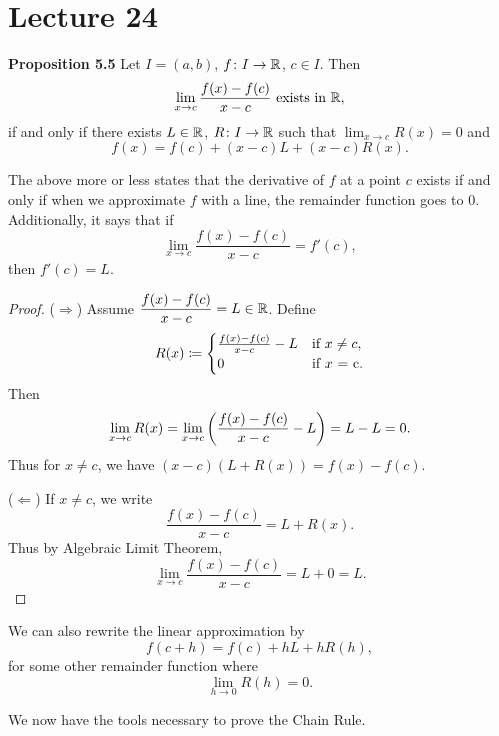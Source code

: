 \documentclass[class=article, crop=false]{standalone}
\begin{document}
  \section{Lecture 24}
  \textbf{Proposition 5.5} Let $I = (a, b)$, $f\colon I\to \mathbb{R}$, $c\in I$. Then
  \[
    \lim_{x\to c} \frac{f(x) - f(c)}{x - c} \text{ exists in }\mathbb{R},
  \]
  if and only if there exists $L\in\mathbb{R}$, $R\colon I\to \mathbb{R}$ such that $\displaystyle \lim_{x\to c} R(x) = 0$ and
  \[
    f(x) = f(c) + (x - c)L + (x - c)R(x).
  \]
  \begin{note}{}
    The above more or less states that the derivative of $f$ at a point $c$ exists if and only if when we approximate $f$ with a line, the remainder function goes to $0$. Additionally, it says that if 
    \[
      \lim_{x\to c} \frac{f(x) - f(c)}{x - c} = f'(c),
    \]
    then $f'(c) = L$.
  \end{note}
  \begin{proof}
    ($\Rightarrow$) Assume $\displaystyle \frac{f(x) - f(c)}{x - c} = L\in\mathbb{R}$. Define
    \[
      R(x)\coloneqq \begin{cases}\frac{f(x) - f(c)}{x - c} - L & \text{if }x\neq c,\\0 & \text{if $x$ = c}.\end{cases}
    \]
    Then
    \[
      \lim_{x\to c} R(x) = \lim_{x\to c} \left( \frac{f(x) - f(c)}{x - c} - L \right) = L - L = 0.
    \]
    Thus for $x\neq c$, we have $(x - c)(L + R(x)) = f(x) - f(c)$. \par
    ($\Leftarrow$) If $x\neq c$, we write
    \[
      \frac{f(x) - f(c)}{x - c} = L + R(x).
    \]
    Thus by Algebraic Limit Theorem,
    \[
      \lim_{x\to c} \frac{f(x) - f(c)}{x - c} = L + 0 = L.
    \]
  \end{proof}
  \begin{note}{}
    We can also rewrite the linear approximation by
    \[
      f(c + h) = f(c) + hL + hR(h),
    \]
    for some other remainder function where
    \[
      \lim_{h\to 0} R(h) = 0.
    \]
  \end{note}
  We now have the tools necessary to prove the Chain Rule.
\end{document}

